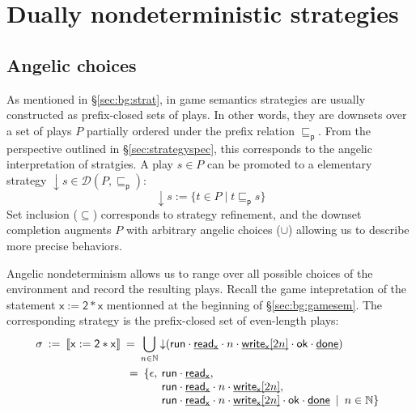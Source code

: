\documentclass[11pt,oneside,draft]{book}
\theoremstyle{definition}
\newcommand{\kw}[1]{\ensuremath{ \mathsf{#1} }}
\newcommand{\pref}{\sqsubseteq_\kw{p}}  %
\newcommand{\ul}[1]{%
  \underline{\smash{#1}}
}
\begin{document}

\section{Dually nondeterministic strategies} \label{sec:dnds} %

\subsection{Angelic choices} %

As mentioned in \S\ref{sec:bg:strat},
in game semantics strategies are usually constructed as
prefix-closed sets of plays.
In other words,
they are downsets over a set of plays $P$
partially ordered under the prefix relation $\pref$.
From the perspective outlined in \S\ref{sec:strategyspec},
this corresponds to the angelic interpretation
of stratgies.
A play $s \in P$ can be promoted to a elementary strategy
${\downarrow} s \in \mathcal{D}(P, {\pref})$:
\[
    {\downarrow} s := \{ t \in P \mid t \pref s \}
\]
Set inclusion ($\subseteq$) corresponds to strategy refinement,
and the downset completion augments $P$ with
arbitrary angelic choices ($\cup$)
allowing us to describe more precise behaviors.

Angelic nondeterminism
allows us to range over all possible choices of the environment
and record the resulting plays.
Recall the game intepretation of the statement
$\kw{x := 2 * x}$
mentionned at the beginning of \S\ref{sec:bg:gamesem}.
The corresponding strategy
is the prefix-closed set of even-length plays:
\begin{align*}
  \sigma \: := \: \llbracket \kw{x := 2 * x} \rrbracket \: &= \:
    \bigcup_{n \in \mathbb{N}} {\downarrow}(
      \kw{run} \cdot
      \ul{\kw{read}_\kw{x}} \cdot n \cdot
      \ul{\kw{write}_\kw{x}[2n]} \cdot \kw{ok} \cdot
      \ul{\kw{done}})
  \\
  &\begin{array}{@{}r@{}l}
     \phantom:= \: \{ \epsilon, \: {}
     &\kw{run} \cdot
        \ul{\kw{read}_\kw{x}} , \\
     &\kw{run} \cdot
        \ul{\kw{read}_\kw{x}} \cdot n \cdot
        \ul{\kw{write}_\kw{x}[2n]} , \\
     &\kw{run} \cdot
        \ul{\kw{read}_\kw{x}} \cdot n \cdot
        \ul{\kw{write}_\kw{x}[2n]} \cdot \kw{ok} \cdot
        \ul{\kw{done}}
        \: \mid \: n \in \mathbb{N} \}
   \end{array}
\end{align*}
\end{document}
